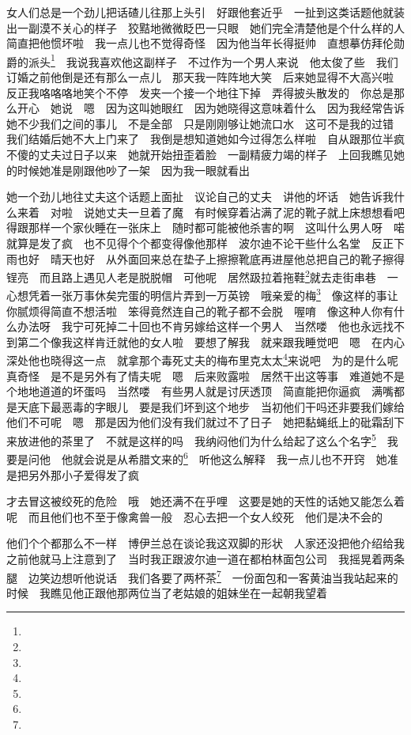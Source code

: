 \par 女人们总是一个劲儿把话碴儿往那上头引　好跟他套近乎　一扯到这类话题他就装出一副漠不关心的样子　狡黠地微微眨巴一只眼　她们完全清楚他是个什么样的人　简直把他惯坏啦　我一点儿也不觉得奇怪　因为他当年长得挺帅　直想摹仿拜伦勋爵的派头\footnote{}　我说我喜欢他这副样子　不过作为一个男人来说　他太俊了些　我们订婚之前他倒是还有那么一点儿　那天我一阵阵地大笑　后来她显得不大高兴啦　反正我咯咯咯地笑个不停　发夹一个接一个地往下掉　弄得披头散发的　你总是那么开心　她说　嗯　因为这叫她眼红　因为她晓得这意味着什么　因为我经常告诉她不少我们之间的事儿　不是全部　只是刚刚够让她流口水　这可不是我的过错　我们结婚后她不大上门来了　我倒是想知道她如今过得怎么样啦　自从跟那位半疯不傻的丈夫过日子以来　她就开始扭歪着脸　一副精疲力竭的样子　上回我瞧见她的时候她准是刚跟他吵了一架　因为我一眼就看出　
\par 她一个劲儿地往丈夫这个话题上面扯　议论自己的丈夫　讲他的坏话　她告诉我什么来着　对啦　说她丈夫一旦着了魔　有时候穿着沾满了泥的靴子就上床想想看吧　得跟那样一个家伙睡在一张床上　随时都可能被他杀害的啊　这叫什么男人呀　喏　就算是发了疯　也不见得个个都变得像他那样　波尔迪不论干些什么名堂　反正下雨也好　晴天也好　从外面回来总在垫子上擦擦靴底再进屋他总把自己的靴子擦得锃亮　而且路上遇见人老是脱脱帽　可他呢　居然趿拉着拖鞋\footnote{}就去走街串巷　一心想凭着一张万事休矣完蛋的明信片弄到一万英镑　哦亲爱的梅\footnote{}　像这样的事让你腻烦得简直不想活啦　笨得竟然连自己的靴子都不会脱　喔唷　像这种人你有什么办法呀　我宁可死掉二十回也不肯另嫁给这样一个男人　当然喽　他也永远找不到第二个像我这样肯迁就他的女人啦　要想了解我　就来跟我睡觉吧　嗯　在内心深处他也晓得这一点　就拿那个毒死丈夫的梅布里克太太\footnote{}来说吧　为的是什么呢　真奇怪　是不是另外有了情夫呢　嗯　后来败露啦　居然干出这等事　难道她不是个地地道道的坏蛋吗　当然喽　有些男人就是讨厌透顶　简直能把你逼疯　满嘴都是天底下最恶毒的字眼儿　要是我们坏到这个地步　当初他们干吗还非要我们嫁给他们不可呢　嗯　那是因为他们没有我们就过不了日子　她把黏蝇纸上的砒霜刮下来放进他的茶里了　不就是这样的吗　我纳闷他们为什么给起了这么个名字\footnote{}　我要是问他　他就会说是从希腊文来的\footnote{}　听他这么解释　我一点儿也不开窍　她准是把另外那小子爱得发了疯　
\par 才去冒这被绞死的危险　哦　她还满不在乎哩　这要是她的天性的话她又能怎么着呢　而且他们也不至于像禽兽一般　忍心去把一个女人绞死　他们是决不会的　
\par 他们个个都那么不一样　博伊兰总在谈论我这双脚的形状　人家还没把他介绍给我之前他就马上注意到了　当时我正跟波尔迪一道在都柏林面包公司　我摇晃着两条腿　边笑边想听他说话　我们各要了两杯茶\footnote{}　一份面包和一客黄油当我站起来的时候　我瞧见他正跟他那两位当了老姑娘的姐妹坐在一起朝我望着　
